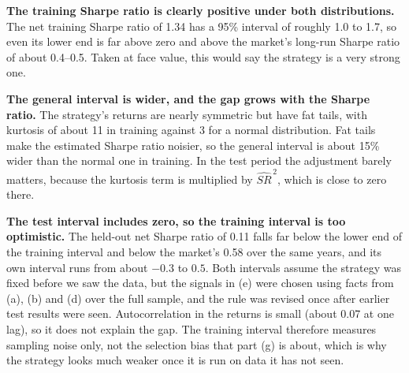 \begin{tight}
  \item \textbf{The training Sharpe ratio is clearly positive under both distributions.} The net
  training Sharpe ratio of 1.34 has a 95\% interval of roughly 1.0 to 1.7, so even its lower end
  is far above zero and above the market's long-run Sharpe ratio of about 0.4--0.5. Taken at face
  value, this would say the strategy is a very strong one.

  \item \textbf{The general interval is wider, and the gap grows with the Sharpe ratio.} The
  strategy's returns are nearly symmetric but have fat tails, with kurtosis of about 11 in
  training against 3 for a normal distribution. Fat tails make the estimated Sharpe ratio
  noisier, so the general interval is about 15\% wider than the normal one in training. In the
  test period the adjustment barely matters, because the kurtosis term is multiplied by
  $\widehat{SR}^{\,2}$, which is close to zero there.

  \item \textbf{The test interval includes zero, so the training interval is too optimistic.} The
  held-out net Sharpe ratio of 0.11 falls far below the lower end of the training interval and
  below the market's 0.58 over the same years, and its own interval runs from about $-0.3$ to
  $0.5$. Both intervals assume the strategy was fixed before we saw the data, but the signals in
  (e) were chosen using facts from (a), (b) and (d) over the full sample, and the rule was
  revised once after earlier test results were seen. Autocorrelation in the returns is small (about 0.07 at
  one lag), so it does not explain the gap. The training interval therefore measures sampling
  noise only, not the selection bias that part (g) is about, which
  is why the strategy looks much weaker once it is run on data it has not seen.
\end{tight}
